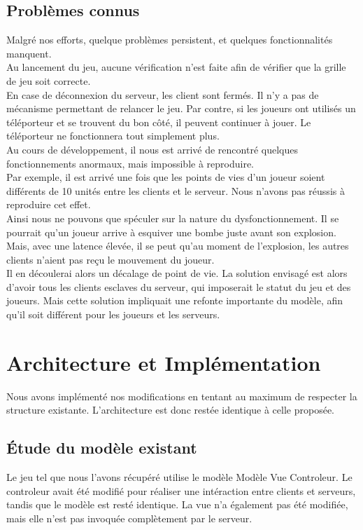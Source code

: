\documentclass[12pt]{article}
\begin{document}
\subsection{Problèmes connus}
Malgré nos efforts, quelque problèmes persistent, et quelques fonctionnalités manquent.\\
Au lancement du jeu, aucune vérification n'est faite afin de vérifier que la grille de jeu soit correcte.\\
En case de déconnexion du serveur, les client sont fermés. Il n'y a pas de mécanisme permettant de relancer le jeu.
Par contre, si les joueurs ont utilisés un téléporteur et se trouvent du bon côté, il peuvent continuer à jouer. Le téléporteur ne fonctionnera tout simplement plus.
\\
Au cours de développement, il nous est arrivé de rencontré quelques fonctionnements anormaux, mais impossible à reproduire.\\
Par exemple, il est arrivé une fois que les points de vies d'un joueur soient différents de 10 unités entre les clients et le serveur. Nous n'avons pas réussis à reproduire cet effet.\\
Ainsi nous ne pouvons que spéculer sur la nature du dysfonctionnement.
Il se pourrait qu'un joueur arrive à esquiver une bombe juste avant son explosion.\\
Mais, avec une latence élevée, il se peut qu'au moment de l'explosion, les autres clients n'aient pas reçu le mouvement du joueur.\\
Il en découlerai alors un décalage de point de vie.
La solution envisagé est alors d'avoir tous les clients esclaves du serveur, qui imposerait le statut du jeu et des joueurs. Mais cette solution impliquait une refonte importante du modèle, afin qu'il soit différent pour les joueurs et les serveurs.
\newpage

\section{Architecture et Implémentation}
Nous avons implémenté nos modifications en tentant au maximum de respecter la structure existante. L'architecture est donc restée identique à celle proposée.

\subsection{Étude du modèle existant}
Le jeu tel que nous l'avons récupéré utilise le modèle Modèle Vue Controleur. Le controleur avait été modifié pour réaliser une intéraction entre clients et serveurs, tandis que le modèle est resté identique. La vue n'a également pas été modifiée, mais elle n'est pas invoquée complètement par le serveur.
\\
\end{document}
